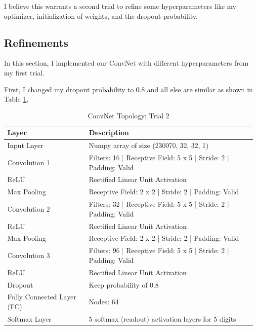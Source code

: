 \documentclass[twoside, column]{article}
\begin{document}
I believe this warrants a second trial to refine some hyperparameters like my optimizer, initialization of weights, and the dropout probability. 

 
 \subsection{Refinements}
 
In this section, I implemented our ConvNet with different hyperparameters from my first trial.
 
First, I changed my dropout probability to 0.8 and all else are similar as shown in Table \ref{trial2topo}. 

\begin{table}[htp]
\caption{ConvNet Topology: Trial 2}
\begin{center}
\begin{tabular}{llr}

\cmidrule(r){1-2}
Layer & Description \\
\midrule
Input Layer & Numpy array of size (230070, 32, 32, 1)\\
Convolution 1 & Filters: 16 | Receptive Field: 5 x 5 | Stride: 2 | Padding: Valid\\
ReLU & Rectified Linear Unit Activation\\
Max Pooling & Receptive Field: 2 x 2 | Stride: 2 | Padding: Valid\\
Convolution 2 & Filters: 32 | Receptive Field: 5 x 5 | Stride: 2 | Padding: Valid\\
ReLU & Rectified Linear Unit Activation\\
Max Pooling & Receptive Field: 2 x 2 | Stride: 2 | Padding: Valid\\
Convolution 3 & Filters: 96 | Receptive Field: 5 x 5 | Stride: 2 | Padding: Valid\\
ReLU & Rectified Linear Unit Activation\\
Dropout & Keep probability of 0.8\\
Fully Connected Layer (FC) & Nodes: 64\\
Softmax Layer & 5 softmax (readout) activation layers for 5 digits \\

\end{tabular}
\end{center}
\label{trial2topo}
\end{table}
\end{document}
